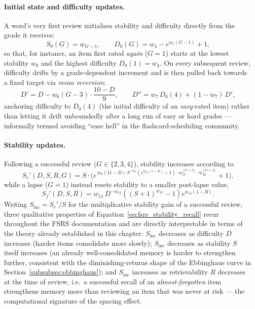        \paragraph{Initial state and difficulty updates.} A word's very first review initialises stability and difficulty directly from the grade it receives:
        \begin{equation}
            \label{eq:fsrs_initial}
            S_0(G) = w_{G-1}, \qquad D_0(G) = w_4 - e^{w_5 (G-1)} + 1,
        \end{equation}
        so that, for instance, an item first rated \emph{again} ($G=1$) starts at the lowest stability $w_0$ and the highest difficulty $D_0(1) = w_4$. On every subsequent review, difficulty drifts by a grade-dependent increment and is then pulled back towards a fixed target via \emph{mean reversion}:
        \begin{equation}
            \label{eq:fsrs_difficulty}
            D' = D - w_6 (G - 3) \cdot \frac{10 - D}{9}, \qquad D'' = w_7 \, D_0(4) + (1 - w_7) \, D',
        \end{equation}
        anchoring difficulty to $D_0(4)$ (the initial difficulty of an \emph{easy}-rated item) rather than letting it drift unboundedly after a long run of easy or hard grades --- informally termed avoiding ``ease hell'' in the flashcard-scheduling community.

        \paragraph{Stability updates.} Following a successful review ($G \in \{2,3,4\}$), stability increases according to
        \begin{equation}
            \label{eq:fsrs_stability_recall}
            S_r'(D, S, R, G) = S \cdot \Big(e^{\,w_8 (11 - D) \, S^{-w_9} \left(e^{w_{10}(1-R)} - 1\right) \cdot w_{15}^{[G=2]} \cdot w_{16}^{[G=4]}} + 1\Big),
        \end{equation}
        while a lapse ($G=1$) instead resets stability to a smaller post-lapse value,
        \begin{equation}
            \label{eq:fsrs_stability_forget}
            S_f'(D, S, R) = w_{11} \, D^{-w_{12}} \left((S+1)^{w_{13}} - 1\right) e^{w_{14}(1-R)}.
        \end{equation}
        Writing $S_{\mathrm{inc}} = S_r'/S$ for the multiplicative stability gain of a successful review, three qualitative properties of Equation~\ref{eq:fsrs_stability_recall} recur throughout the FSRS documentation and are directly interpretable in terms of the theory already established in this chapter: $S_{\mathrm{inc}}$ decreases as difficulty $D$ increases (harder items consolidate more slowly); $S_{\mathrm{inc}}$ decreases as stability $S$ itself increases (an already well-consolidated memory is harder to strengthen further, consistent with the diminishing-returns shape of the Ebbinghaus curve in Section~\ref{subsubsec:ebbinghaus}); and $S_{\mathrm{inc}}$ increases as retrievability $R$ decreases at the time of review, i.e.\ a successful recall of an \emph{almost-forgotten} item strengthens memory more than reviewing an item that was never at risk --- the computational signature of the spacing effect.

